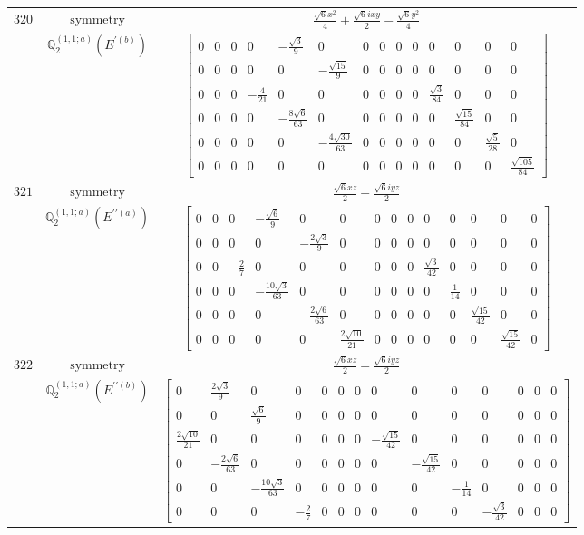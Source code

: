 \documentclass[fleqn,8pt,landscape]{jsarticle}
\begin{document}
\begin{longtable}{ccc}
$ 320 $ & $ \text{symmetry} $ & $ \frac{\sqrt{6} x^{2}}{4} + \frac{\sqrt{6} i x y}{2} - \frac{\sqrt{6} y^{2}}{4} $ \\
$  $ & $ \mathbb{Q}_{2}^{(1,1;a)}(E^{\prime(b)}) $ & $ \begin{bmatrix} 0 & 0 & 0 & 0 & - \frac{\sqrt{3}}{9} & 0 & 0 & 0 & 0 & 0 & 0 & 0 & 0 & 0 \\ 0 & 0 & 0 & 0 & 0 & - \frac{\sqrt{15}}{9} & 0 & 0 & 0 & 0 & 0 & 0 & 0 & 0 \\ 0 & 0 & 0 & - \frac{4}{21} & 0 & 0 & 0 & 0 & 0 & 0 & \frac{\sqrt{3}}{84} & 0 & 0 & 0 \\ 0 & 0 & 0 & 0 & - \frac{8 \sqrt{6}}{63} & 0 & 0 & 0 & 0 & 0 & 0 & \frac{\sqrt{15}}{84} & 0 & 0 \\ 0 & 0 & 0 & 0 & 0 & - \frac{4 \sqrt{30}}{63} & 0 & 0 & 0 & 0 & 0 & 0 & \frac{\sqrt{5}}{28} & 0 \\ 0 & 0 & 0 & 0 & 0 & 0 & 0 & 0 & 0 & 0 & 0 & 0 & 0 & \frac{\sqrt{105}}{84} \end{bmatrix} $ \\ \hline
$ 321 $ & $ \text{symmetry} $ & $ \frac{\sqrt{6} x z}{2} + \frac{\sqrt{6} i y z}{2} $ \\
$  $ & $ \mathbb{Q}_{2}^{(1,1;a)}(E^{\prime\prime(a)}) $ & $ \begin{bmatrix} 0 & 0 & 0 & - \frac{\sqrt{6}}{9} & 0 & 0 & 0 & 0 & 0 & 0 & 0 & 0 & 0 & 0 \\ 0 & 0 & 0 & 0 & - \frac{2 \sqrt{3}}{9} & 0 & 0 & 0 & 0 & 0 & 0 & 0 & 0 & 0 \\ 0 & 0 & - \frac{2}{7} & 0 & 0 & 0 & 0 & 0 & 0 & \frac{\sqrt{3}}{42} & 0 & 0 & 0 & 0 \\ 0 & 0 & 0 & - \frac{10 \sqrt{3}}{63} & 0 & 0 & 0 & 0 & 0 & 0 & \frac{1}{14} & 0 & 0 & 0 \\ 0 & 0 & 0 & 0 & - \frac{2 \sqrt{6}}{63} & 0 & 0 & 0 & 0 & 0 & 0 & \frac{\sqrt{15}}{42} & 0 & 0 \\ 0 & 0 & 0 & 0 & 0 & \frac{2 \sqrt{10}}{21} & 0 & 0 & 0 & 0 & 0 & 0 & \frac{\sqrt{15}}{42} & 0 \end{bmatrix} $ \\ \hline
$ 322 $ & $ \text{symmetry} $ & $ \frac{\sqrt{6} x z}{2} - \frac{\sqrt{6} i y z}{2} $ \\
$  $ & $ \mathbb{Q}_{2}^{(1,1;a)}(E^{\prime\prime(b)}) $ & $ \begin{bmatrix} 0 & \frac{2 \sqrt{3}}{9} & 0 & 0 & 0 & 0 & 0 & 0 & 0 & 0 & 0 & 0 & 0 & 0 \\ 0 & 0 & \frac{\sqrt{6}}{9} & 0 & 0 & 0 & 0 & 0 & 0 & 0 & 0 & 0 & 0 & 0 \\ \frac{2 \sqrt{10}}{21} & 0 & 0 & 0 & 0 & 0 & 0 & - \frac{\sqrt{15}}{42} & 0 & 0 & 0 & 0 & 0 & 0 \\ 0 & - \frac{2 \sqrt{6}}{63} & 0 & 0 & 0 & 0 & 0 & 0 & - \frac{\sqrt{15}}{42} & 0 & 0 & 0 & 0 & 0 \\ 0 & 0 & - \frac{10 \sqrt{3}}{63} & 0 & 0 & 0 & 0 & 0 & 0 & - \frac{1}{14} & 0 & 0 & 0 & 0 \\ 0 & 0 & 0 & - \frac{2}{7} & 0 & 0 & 0 & 0 & 0 & 0 & - \frac{\sqrt{3}}{42} & 0 & 0 & 0 \end{bmatrix} $ \\ \hline

\end{longtable}
\end{document}
